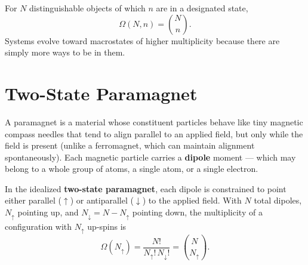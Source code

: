 For $N$ distinguishable objects of which $n$ are in a designated state,
\[
    \Omega(N, n) = \binom{N}{n}.
\]
Systems evolve toward macrostates of higher multiplicity because there are simply more ways to be in them.

\section{Two-State Paramagnet}

A paramagnet is a material whose constituent particles behave like tiny magnetic compass needles that tend to align parallel to an applied field, but only while the field is present (unlike a ferromagnet, which can maintain alignment spontaneously). Each magnetic particle carries a \textbf{dipole} moment --- which may belong to a whole group of atoms, a single atom, or a single electron.

In the idealized \textbf{two-state paramagnet}, each dipole is constrained to point either parallel ($\uparrow$) or antiparallel ($\downarrow$) to the applied field. With $N$ total dipoles, $N_\uparrow$ pointing up, and $N_\downarrow = N - N_\uparrow$ pointing down, the multiplicity of a configuration with $N_\uparrow$ up-spins is
\[
    \Omega(N_\uparrow) = \frac{N!}{N_\uparrow!\, N_\downarrow!} = \binom{N}{N_\uparrow}.
\]
